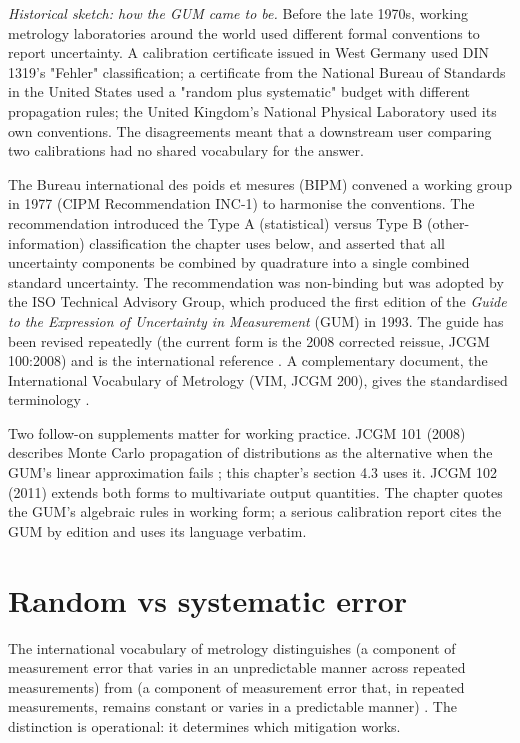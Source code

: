 \begin{mastery}
\textit{Historical sketch: how the GUM came to be.}
Before the late 1970s, working metrology laboratories around the
world used different formal conventions to report uncertainty. A
calibration certificate issued in West Germany used DIN 1319's
"Fehler" classification; a certificate from the National Bureau of
Standards in the United States used a "random plus systematic"
budget with different propagation rules; the United Kingdom's
National Physical Laboratory used its own conventions. The
disagreements meant that a downstream user comparing two
calibrations had no shared vocabulary for the answer.

The Bureau international des poids et mesures (BIPM) convened a
working group in 1977 (CIPM Recommendation INC-1) to harmonise
the conventions. The recommendation introduced the Type A
(statistical) versus Type B (other-information) classification
the chapter uses below, and asserted that all uncertainty
components be combined by quadrature into a single combined
standard uncertainty. The recommendation was non-binding but was
adopted by the ISO Technical Advisory Group, which produced the
first edition of the \textit{Guide to the Expression of
Uncertainty in Measurement} (GUM) in 1993. The guide has been
revised repeatedly (the current form is the 2008 corrected
reissue, JCGM 100:2008) and is the international reference
\cite{std:iso-iec-guide98}. A complementary document, the
International Vocabulary of Metrology (VIM, JCGM 200), gives the
standardised terminology \cite{std:jcgm-vim}.

Two follow-on supplements matter for working practice. JCGM 101
(2008) describes Monte Carlo propagation of distributions as the
alternative when the GUM's linear approximation fails
\cite{std:jcgm-101}; this chapter's section 4.3 uses it. JCGM 102
(2011) extends both forms to multivariate output quantities. The
chapter quotes the GUM's algebraic rules in working form; a
serious calibration report cites the GUM by edition and uses its
language verbatim.
\end{mastery}

\section{Random vs systematic error}

The international vocabulary of metrology distinguishes
 (a component of measurement error that
varies in an unpredictable manner across repeated measurements) from
 (a component of measurement error that,
in repeated measurements, remains constant or varies in a
predictable manner) \cite{std:jcgm-vim}. The distinction is
operational: it determines which mitigation works.

